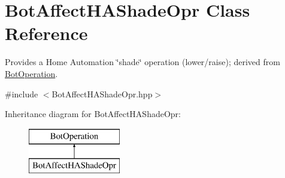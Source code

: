 \hypertarget{classBotAffectHAShadeOpr}{\section{Bot\-Affect\-H\-A\-Shade\-Opr Class Reference}
\label{classBotAffectHAShadeOpr}
}


Provides a Home Automation \char`\"{}shade\char`\"{} operation (lower/raise); derived from \hyperlink{classBotOperation}{Bot\-Operation}.  




{\ttfamily \#include $<$Bot\-Affect\-H\-A\-Shade\-Opr.\-hpp$>$}

Inheritance diagram for Bot\-Affect\-H\-A\-Shade\-Opr\-:\begin{figure}[H]
\begin{center}
\leavevmode
\includegraphics[height=2.000000cm]{classBotAffectHAShadeOpr}
\end{center}
\end{figure}
